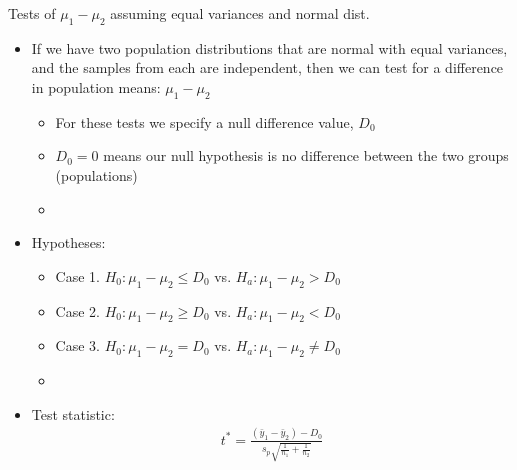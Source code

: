 \documentclass[xcolor=dvipsnames]{beamer}
\begin{document}
\begin{frame}{Tests of $\mu_1 - \mu_2$ assuming equal variances and normal dist.}
\begin{itemize}
	\item If we have two population distributions that are normal with equal variances, and the samples from each are independent, then we can test for a difference in population means: $\mu_1 - \mu_2$ \pause
	
	\begin{itemize}
		\item For these tests we specify a null difference value, $D_0$ \pause
		\item $D_0 = 0$ means our null hypothesis is no difference between the two groups (populations)
		\item[]
	\end{itemize}
	\item Hypotheses: \pause
	\begin{itemize}
		\item Case 1. $H_0: \mu_1 - \mu_2 \leq D_0$ vs. $H_a: \mu_1 - \mu_2 > D_0$ \pause
		\item Case 2. $H_0: \mu_1 - \mu_2 \geq D_0$ vs. $H_a: \mu_1 - \mu_2 < D_0$ \pause
		\item Case 3. $H_0: \mu_1 - \mu_2 = D_0$ vs. $H_a: \mu_1 - \mu_2 \neq D_0$ \pause
		\item[]
	\end{itemize}
	\item Test statistic:
	\begin{align*}
	t^* = \frac{(\bar{y}_1-\bar{y}_2) - D_0}{s_p \sqrt{\frac{1}{n_1} + \frac{1}{n_2}}}
	\end{align*}
\end{itemize}
\end{frame}
\end{document}

